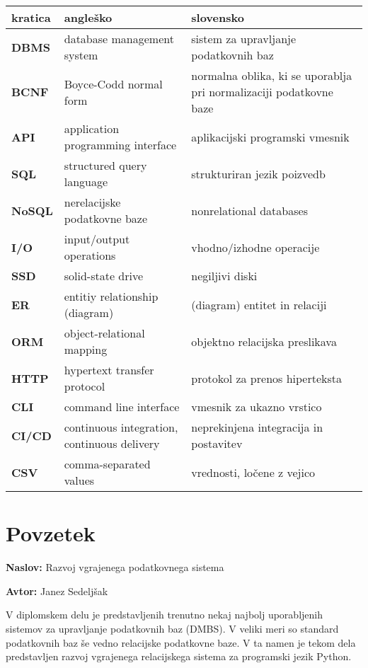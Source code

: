 \documentclass[a4paper,12pt,openright]{book}
\newcommand{\ttitle}{Razvoj vgrajenega podatkovnega sistema}
\newcommand{\tauthor}{Janez Sedeljšak}
\newcommand{\clearemptydoublepage}{\newpage{\pagestyle{empty}\cleardoublepage}}
\begin{document}
\noindent\begin{tabular}{p{}|p{}|p{}}    %
  {\bf kratica} & {\bf angleško}                              & {\bf slovensko} \\ \hline
  {\bf DBMS} & database management system & sistem za upravljanje podatkovnih baz \\
  {\bf BCNF} & Boyce-Codd normal form & normalna oblika, ki se uporablja pri normalizaciji podatkovne baze \\
  {\bf API} & application programming interface & aplikacijski programski vmesnik \\
  {\bf SQL} & structured query language & strukturiran jezik poizvedb \\
  {\bf NoSQL} & nerelacijske podatkovne baze & nonrelational databases \\
  {\bf I/O} & input/output operations & vhodno/izhodne operacije \\
  {\bf SSD} & solid-state drive & negiljivi diski \\
  {\bf ER} & entitiy relationship (diagram) & (diagram) entitet in relaciji \\
  {\bf ORM} & object-relational mapping & objektno relacijska preslikava \\
  {\bf HTTP} & hypertext transfer protocol & protokol za prenos hiperteksta \\
  {\bf CLI} & command line interface & vmesnik za ukazno vrstico \\
  {\bf CI/CD} & continuous integration, continuous delivery & neprekinjena integracija in postavitev \\
  {\bf CSV} & comma-separated values & vrednosti, ločene z vejico \\
\end{tabular}


\clearemptydoublepage

{}
\chapter*{Povzetek}

\noindent\textbf{Naslov:} \ttitle
\bigskip

\noindent\textbf{Avtor:} \tauthor
\bigskip

\noindent V diplomskem delu je predstavljenih trenutno nekaj najbolj uporabljenih sistemov za upravljanje podatkovnih baz (DMBS). V veliki meri so standard podatkovnih baz še vedno relacijske podatkovne baze. V ta namen je tekom dela predstavljen razvoj vgrajenega relacijskega sistema za programski jezik Python.
\end{document}
